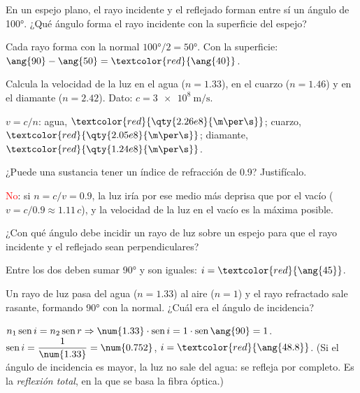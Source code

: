 \begin{exercise}
    En un espejo plano, el rayo incidente y el reflejado forman entre sí un ángulo de \ang{100}. ¿Qué ángulo forma el rayo incidente con la superficie del espejo?
    \begin{solu}
        Cada rayo forma con la normal \(\ang{100}/2 = \ang{50}\). Con la superficie: \(\ang{90} - \ang{50} = \textcolor{red}{\ang{40}}\).
    \end{solu}
\end{exercise}

\begin{exercise}
    Calcula la velocidad de la luz en el agua (\(n = \num{1.33}\)), en el cuarzo (\(n = \num{1.46}\)) y en el diamante (\(n = \num{2.42}\)). Dato: \(c = \qty{3e8}{\m\per\s}\).
    \begin{solu}
        \(v = c/n\): agua, \(\textcolor{red}{\qty{2.26e8}{\m\per\s}}\); cuarzo, \(\textcolor{red}{\qty{2.05e8}{\m\per\s}}\); diamante, \(\textcolor{red}{\qty{1.24e8}{\m\per\s}}\).
    \end{solu}
\end{exercise}

\begin{exercise}
    ¿Puede una sustancia tener un índice de refracción de \num{0.9}? Justifícalo.
    \begin{solu}
        \textcolor{red}{No}: si \(n = c/v = \num{0.9}\), la luz iría por ese medio más deprisa que por el vacío (\(v = c/\num{0.9} \approx \num{1.11}\,c\)), y la velocidad de la luz en el vacío es la máxima posible.
    \end{solu}
\end{exercise}

\begin{exercise}
    ¿Con qué ángulo debe incidir un rayo de luz sobre un espejo para que el rayo incidente y el reflejado sean perpendiculares?
    \begin{solu}
        Entre los dos deben sumar \ang{90} y son iguales: \(i = \textcolor{red}{\ang{45}}\).
    \end{solu}
\end{exercise}

\begin{exercise}
    Un rayo de luz pasa del agua (\(n = \num{1.33}\)) al aire (\(n = 1\)) y el rayo refractado sale rasante, formando \ang{90} con la normal. ¿Cuál era el ángulo de incidencia?
    \begin{solu}
        \(n_1 \sen i = n_2 \sen r \Rightarrow \num{1.33} \cdot \sen i = 1 \cdot \sen \ang{90} = 1\). \(\sen i = \dfrac{1}{\num{1.33}} = \num{0.752}\), \(i = \textcolor{red}{\ang{48.8}}\). (Si el ángulo de incidencia es mayor, la luz no sale del agua: se refleja por completo. Es la \emph{reflexión total}, en la que se basa la fibra óptica.)
    \end{solu}
\end{exercise}

